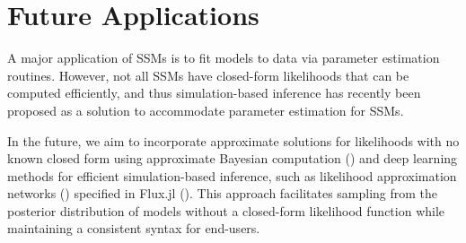 \documentclass{juliacon}
\begin{document}
\section{Future Applications}

A major application of SSMs is to fit models to data via parameter estimation routines. However, not all SSMs have closed-form likelihoods that can be computed efficiently, and thus simulation-based inference has recently been proposed as a solution to accommodate parameter estimation for SSMs.

In the future, we aim to incorporate approximate solutions for likelihoods with no known closed form using approximate Bayesian computation (\cite{palestro2018likelihood}) and deep learning methods for efficient simulation-based inference, such as likelihood approximation networks (\cite{Fengler2020LikelihoodAN}) specified in Flux.jl (\cite{innesFlux}). This approach facilitates sampling from the posterior distribution of models without a closed-form likelihood function while maintaining a consistent syntax for end-users.



\end{document}
